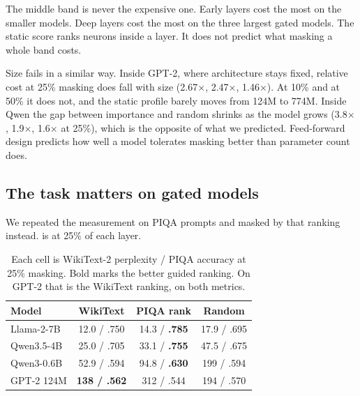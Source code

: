 \documentclass{article}
\begin{document}
The middle band is never the expensive one.
Early layers cost the most on the smaller models.
Deep layers cost the most on the three largest gated models.
The static score ranks neurons inside a layer.
It does not predict what masking a whole band costs.

Size fails in a similar way.
Inside GPT-2, where architecture stays fixed, relative cost at 25\% masking does fall with size (2.67$\times$, 2.47$\times$, 1.46$\times$).
At 10\% and at 50\% it does not, and the static profile barely moves from 124M to 774M.
Inside Qwen the gap between importance and random shrinks as the model grows (3.8$\times$, 1.9$\times$, 1.6$\times$ at 25\%), which is the opposite of what we predicted.
Feed-forward design predicts how well a model tolerates masking better than parameter count does.

\subsection{The task matters on gated models}

We repeated the measurement on PIQA prompts and masked by that ranking instead.
 is at 25\% of each layer.

\begin{table}[t]
  \caption{Each cell is WikiText-2 perplexity / PIQA accuracy at 25\% masking.
  Bold marks the better guided ranking. On GPT-2 that is the WikiText ranking, on both metrics.}
  \label{tab:task}
  \begin{center}
    \begin{footnotesize}
      \begin{sc}
        \begin{tabular}{lccc}
          \toprule
          Model & WikiText & PIQA rank & Random \\
          \midrule
          Llama-2-7B & 12.0 / .750 & 14.3 / \textbf{.785} & 17.9 / .695 \\
          Qwen3.5-4B & 25.0 / .705 & 33.1 / \textbf{.755} & 47.5 / .675 \\
          Qwen3-0.6B & 52.9 / .594 & 94.8 / \textbf{.630} & 199 / .594 \\
          GPT-2 124M & \textbf{138 / .562} & 312 / .544 & 194 / .570 \\
          \bottomrule
        \end{tabular}
      \end{sc}
    \end{footnotesize}
  \end{center}
  \vskip -0.1in
\end{table}
\end{document}
